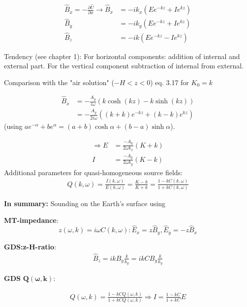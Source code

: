 \begin{align*}
\hat{B}_x=-\frac{\partial \hat{U}}{\partial x}\rightarrow \hat{B}_x&=-ik_x(Ee^{-kz}+Ie^{kz})\\
\hat{B}_y&=-ik_y(Ee^{-kz}+Ie^{kz})\\
\hat{B}_z&=-ik(Ee^{-kz}-Ie^{kz})
\end{align*}

Tendency (see chapter 1): For horizontal components: addition of internal and external part. For the vertical component subtraction of internal from external.


Comparison with the "air solution" ($-H<z<0$) eq. 3.17 for $K_0=k$

\begin{align*}
\hat{B}_x&=-\frac{A_y}{i\omega}(k\cosh(kz)-k\sinh(kz))\\
&=-\frac{A_y}{2i\omega}((k+k)e^{-kz}+(k-k)e^{kz})
\end{align*}
(using $ae^{-\alpha}+be^\alpha=(a+b)\cosh\alpha+(b-a)\sinh\alpha$).

\begin{align}
\Rightarrow E&=\frac{-A_y}{2\omega k_x}(K+k)\\
I&=\frac{-A_y}{2\omega k_y}(K-k)
\end{align}
Additional parameters for quasi-homogeneous source fields:
\begin{align}
Q(k,\omega)=\frac{I(k,\omega)}{E(k,\omega)}=\frac{K-k}{K+k}=\frac{1-kC(k,\omega)}{1+kC(k,\omega)}
\end{align}

\textbf{In summary:} Sounding on the Earth's surface using 

\textbf{MT-impedance}:
\begin{equation*}
z(\omega,k)=i\omega C(k,\omega):\hat{E}_x=z\hat{B}_y, \hat{E}_y=-z\hat{B}_x
\end{equation*}

\textbf{GDS:z-H-ratio}:
\begin{align*}
\hat{B}_z=ikB_y\frac{k}{k_y}=ikCB_y\frac{k}{k_y}
\end{align*}

\textbf{GDS} $\mathbf{ Q(\omega,k)}$:

\begin{align*}
Q(\omega,k)=\frac{1-kCQ(\omega,k)}{1+kCQ(\omega,k)}\Rightarrow I=\frac{1-kC}{1+kC}E
\end{align*}

